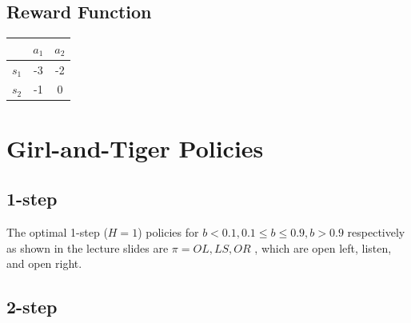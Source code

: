 \subsection{Reward Function}

\begin{center}
\begin{tabular}{c c c} 
    \hline
        & $a_1$ & $a_2$ \\ 
    \hline
    $s_1$ & -3 & -2 \\
    $s_2$ & -1 & 0 \\
    \hline
\end{tabular}
\end{center}


\newpage
\section{Girl-and-Tiger Policies}
\subsection{1-step}
The optimal 1-step ($H=1$) policies for $b<0.1,0.1\leq b \leq 0.9, b>0.9$
respectively as shown in the lecture slides are $\pi=OL,LS,OR$ \cite{cai21}, 
which are open left, listen, and open right.

\subsection{2-step}


